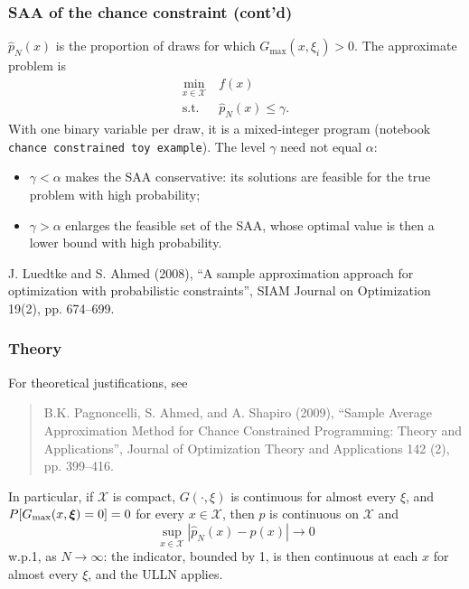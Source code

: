 \documentclass[aspectratio=169]{beamer}
\begin{document}
\begin{frame}
	\frametitle{SAA of the chance constraint (cont'd)}
	
	$\hat{p}_N(x)$ is the proportion of draws for which $G_{\max}(x,\xi_i) > 0$.
	The approximate problem is
	\begin{align*}
		\min_{x \in \mathcal{X}}\ & f(x) \\
		\mbox{s.t. } & \hat{p}_N(x) \leq \gamma.
	\end{align*}
	With one binary variable per draw, it is a mixed-integer program (notebook {\tt chance constrained toy example}).
	The level $\gamma$ need not equal $\alpha$:
	\begin{itemize}
	\item
	$\gamma < \alpha$ makes the SAA conservative: its solutions are feasible for the true problem with high probability;
	\item
	$\gamma > \alpha$ enlarges the feasible set of the SAA, whose optimal value is then a lower bound with high probability.
	\end{itemize}
	{\footnotesize J. Luedtke and S. Ahmed (2008), ``A sample approximation approach for optimization with probabilistic constraints'', SIAM Journal on Optimization 19(2), pp. 674--699.}
	
\end{frame}

\begin{frame}
	\frametitle{Theory}
	
	For theoretical justifications, see
	\begin{quote}
		B.K. Pagnoncelli, S. Ahmed, and A. Shapiro (2009), ``Sample Average Approximation Method for Chance
		Constrained Programming: Theory and Applications'', Journal of Optimization Theory and Applications 142 (2), pp. 399--416.
	\end{quote}
	
	\mbox{}
	
	In particular, if $\mathcal{X}$ is compact, $G(\cdot,\xi)$ is continuous for almost every $\xi$, and $P[G_{\max}(x,{\boldsymbol{\xi}}) = 0] = 0$ for every $x \in \mathcal{X}$, then $p$ is continuous on $\mathcal{X}$ and
	\[
	\sup_{x \in \mathcal{X}} |\hat{p}_N(x) - p(x)| \rightarrow 0
	\]
	w.p.1, as $N \rightarrow \infty$: the indicator, bounded by 1, is then continuous at each $x$ for almost every $\xi$, and the ULLN applies.
	
\end{frame}
\end{document}

